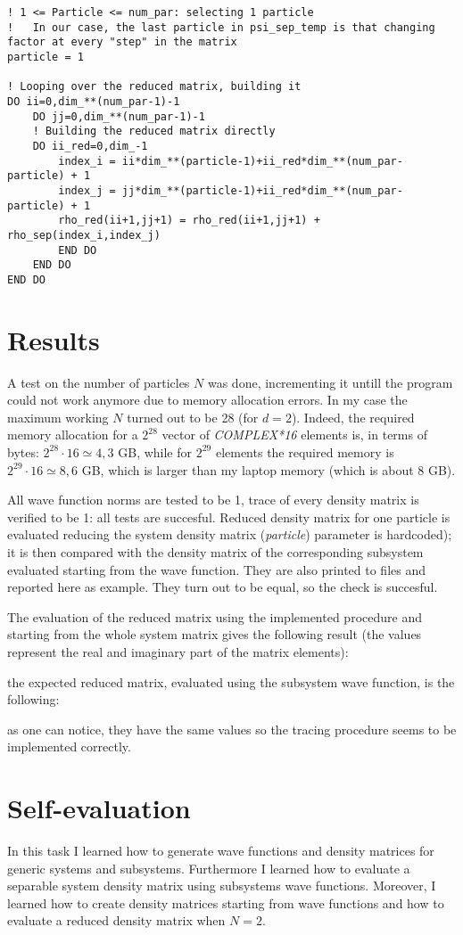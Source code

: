 \documentclass[12pt, a4paper, notitlepage]{report}
\begin{document}
\begin{lstlisting}
! 1 <= Particle <= num_par: selecting 1 particle
!	In our case, the last particle in psi_sep_temp is that changing factor at every "step" in the matrix
particle = 1

! Looping over the reduced matrix, building it
DO ii=0,dim_**(num_par-1)-1
	DO jj=0,dim_**(num_par-1)-1
	! Building the reduced matrix directly
	DO ii_red=0,dim_-1
		index_i = ii*dim_**(particle-1)+ii_red*dim_**(num_par-particle) + 1
		index_j = jj*dim_**(particle-1)+ii_red*dim_**(num_par-particle) + 1
		rho_red(ii+1,jj+1) = rho_red(ii+1,jj+1) + rho_sep(index_i,index_j)
		END DO
	END DO
END DO
\end{lstlisting}

\section*{Results}

A test on the number of particles $N$ was done, incrementing it untill the program could not work anymore due to memory allocation errors. In my case the maximum working $N$ turned out to be 28 (for $d=2$). Indeed, the required memory allocation for a $2^{28}$ vector of \textit{COMPLEX*16} elements is, in terms of bytes: $2^{28} \cdot 16 \simeq 4,3$ GB, while for $2^{29}$ elements the required memory is $2^{29} \cdot  16 \simeq 8,6$ GB, which is larger than my laptop memory (which is about 8 GB).

All wave function norms are tested to be 1, trace of every density matrix is verified to be 1: all tests are succesful.
Reduced density matrix for one particle is evaluated reducing the system density matrix (\textit{particle}) parameter is hardcoded); it is then compared with the density matrix of the corresponding subsystem evaluated starting from the wave function. They are also printed to files and reported here as example. They turn out to be equal, so the check is succesful.

The evaluation of the reduced matrix using the implemented procedure and starting from the whole system matrix gives the following result (the values represent the real and imaginary part of the matrix elements):

the expected reduced matrix, evaluated using the subsystem wave function, is the following:

as one can notice, they have the same values so the tracing procedure seems to be implemented correctly.

\section*{Self-evaluation}
In this task I learned how to generate wave functions and density matrices for generic systems and subsystems. Furthermore I learned how to evaluate a separable system density matrix using subsystems wave functions. Moreover, I learned how to create density matrices starting from wave functions and how to evaluate a reduced density matrix when $N=2$.
\end{document}
